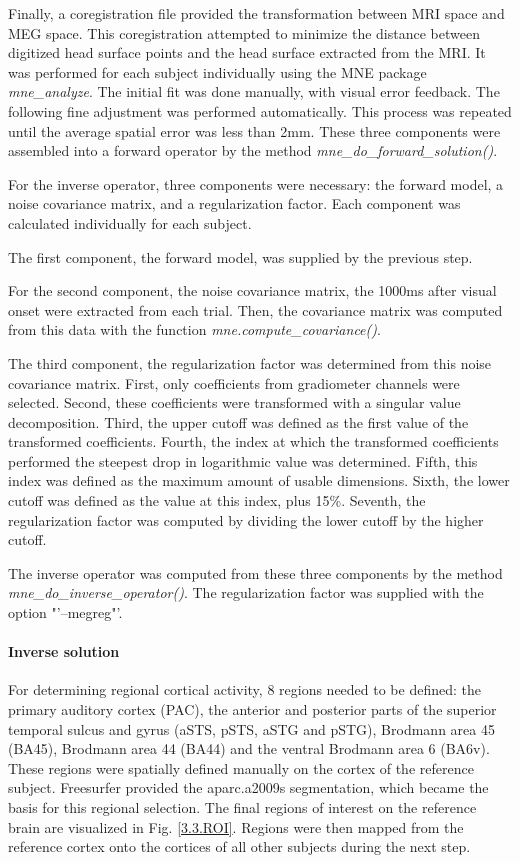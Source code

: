 Finally, a coregistration file provided the transformation between MRI space and MEG space.
This coregistration attempted to minimize the distance between digitized head surface points and the head surface extracted from the MRI. 
It was performed for each subject individually using the MNE package \emph{mne\_analyze}.
The initial fit was done manually, with visual error feedback.
The following fine adjustment was performed automatically.
This process was repeated until the average spatial error was less than 2mm.
These three components were assembled into a forward operator by the method \emph{mne\_do\_forward\_solution()}.


For the inverse operator, three components were necessary: the forward model, a noise covariance matrix, and a regularization factor.
Each component was calculated individually for each subject.

The first component, the forward model, was supplied by the previous step.

For the second component, the noise covariance matrix, the 1000ms after visual onset were extracted from each trial.
Then, the covariance matrix was computed from this data with the function \emph{mne.compute\_covariance()}.

The third component, the regularization factor was determined from this noise covariance matrix.
First, only coefficients from gradiometer channels were selected.
Second, these coefficients were transformed with a singular value decomposition.
Third, the upper cutoff was defined as the first value of the transformed coefficients.
Fourth, the index at which the transformed coefficients performed the steepest drop in logarithmic value was determined.
Fifth, this index was defined as the maximum amount of usable dimensions.
Sixth, the lower cutoff was defined as the value at this index, plus 15\%.
Seventh, the regularization factor was computed by dividing the lower cutoff by the higher cutoff.


The inverse operator was computed from these three components by the method \linebreak \emph{mne\_do\_inverse\_operator()}. The regularization factor was supplied with the option \linebreak "'--megreg"'.

\paragraph{Inverse solution}
For determining regional cortical activity, 8 regions needed to be defined: the primary auditory cortex (PAC), the anterior and posterior parts of the superior temporal sulcus and gyrus (aSTS, pSTS, aSTG and pSTG), Brodmann area 45 (BA45), Brodmann area 44 (BA44) and the ventral Brodmann area 6 (BA6v).
These regions were spatially defined manually on the cortex of the reference subject.
Freesurfer provided the aparc.a2009s segmentation, which became the basis for this regional selection.
The final regions of interest on the reference brain are visualized in Fig. \ref{3.3.ROI}.
Regions were then mapped from the reference cortex onto the cortices of all other subjects during the next step.

